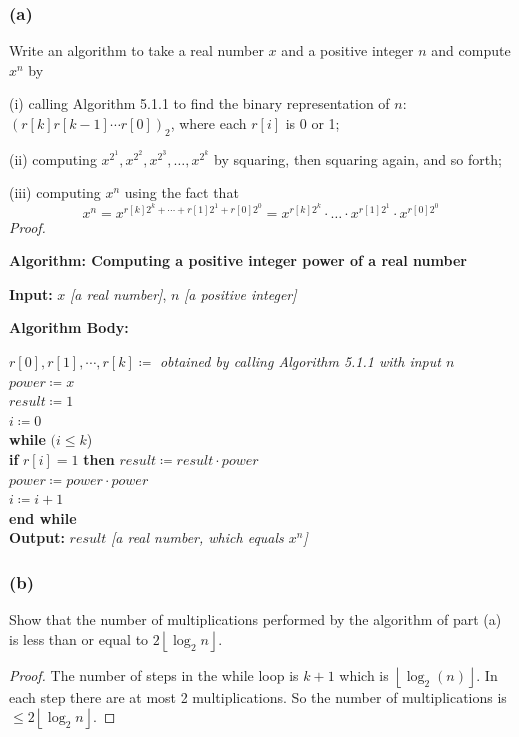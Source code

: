 \documentclass[14pt]{extarticle}
\newcommand{\cy}{\color{cyan}}
\newcommand{\floor}[1]{{\left\lfloor#1\right\rfloor}}
\begin{document}
\subsubsection{(a)}
Write an algorithm to take a real number \(x\) and a positive integer \(n\) and compute \(x^n\) by

(i) calling Algorithm 5.1.1 to find the binary representation of \(n\): \((r[k] r[k - 1] \cdots r[0])_2\), where each
\(r[i]\) is 0 or 1;

(ii) computing \(x^{2^1}, x^{2^2}, x^{2^3}, \ldots, x^{2^k}\) by squaring, then squaring again, and so forth;

(iii) computing \(x^n\) using the fact that
\[
    x^n = x^{r[k]2^k + \cdots + r[1]2^1 + r[0]2^0} = x^{r[k]2^k} \cdot \ldots \cdot x^{r[1]2^1} \cdot x^{r[0]2^0}
\]
{\it Proof.}
\begin{tcolorbox}[colframe=cyan]
    {\bf \cy Algorithm: Computing a positive integer power of a real number}

    {\bf Input:} \(x\) {\it [a real number]}, \(n\) {\it [a positive integer]}

        {\bf Algorithm Body:}
    \begin{tabbing}
        \(r[0], r[1], \cdots, r[k] \coloneqq\) {\it obtained by calling Algorithm 5.1.1 with input \(n\)} \\
        \(power \coloneqq x\) \\
        \(result \coloneqq 1\) \\
        \(i \coloneqq 0\) \\
        {\bf while} \= \((i \leq k\)) \\
        \> {\bf if} \(r[i] = 1\) {\bf then} \(result \coloneqq result \cdot power\) \\
        \> \(power \coloneqq power \cdot power\) \\
        \> \(i \coloneqq i + 1\) \\
        {\bf end while} \\
        {\bf Output:} \(result\) {\it [a real number, which equals \(x^n\)]}
    \end{tabbing}
\end{tcolorbox}

\subsubsection{(b)}
Show that the number of multiplications performed by the algorithm of part (a) is less than or equal to
\(2\floor{\log_2 n}\).

\begin{proof}
    The number of steps in the while loop is \(k+1\) which is \(\floor{\log_2(n)}\). In each step there are at most 2
    multiplications. So the number of multiplications is \(\leq 2 \floor{\log_2 n}\).
\end{proof}
\end{document}
